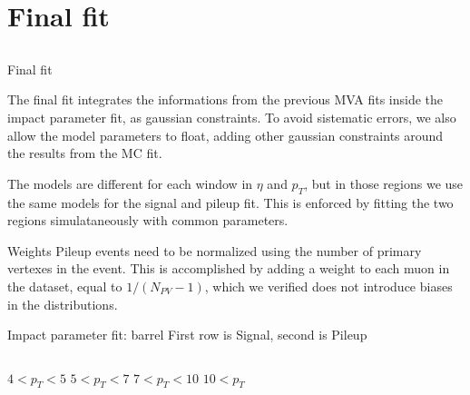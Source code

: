 \section{Final fit}

\subsection{}

\begin{frame}{Final fit}
	\begin{block}{}
		The final fit integrates the informations from the previous MVA fits inside the impact parameter fit, as gaussian constraints.
		To avoid sistematic errors, we also allow the model parameters to float, adding other gaussian constraints around the results from the MC fit.
		
		The models are different for each window in $\eta$ and $p_T$, but in those regions we use the same models for the signal and pileup fit. 
		This is enforced by fitting the two regions simulataneously with common parameters.
	\end{block}
	\begin{block}{Weights}
		Pileup events need to be normalized using the number of primary vertexes in the event.
		This is accomplished by adding a weight to each muon in the dataset, equal to $1/(N_{PV}-1)$, which we verified does not introduce biases in the distributions.
	\end{block}
\end{frame}

\begin{frame}{Impact parameter fit: barrel}
	First row is Signal, second is Pileup
	\vspace{1cm}
	\begin{columns}[c]
			\centering
			$4<p_T<5$
			\centering
			$5<p_T<7$
			\centering
			$7<p_T<10$
			\centering
			$10<p_T$
	\end{columns}
\end{frame}

